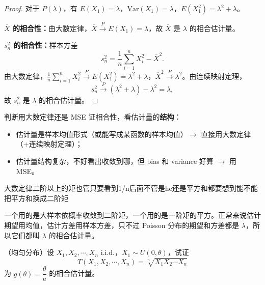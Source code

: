 \begin{proof}
对于 $P(\lambda)$，有 $E(X_1) = \lambda$，$\mathrm{Var}(X_1) = \lambda$，$E(X_1^2) = \lambda^2 + \lambda$。

\textbf{$\overline{X}$ 的相合性：}由大数定律，$\overline{X} \xrightarrow{P} E(X_1) = \lambda$，故 $\overline{X}$ 是 $\lambda$ 的相合估计量。

\textbf{$s_n^2$ 的相合性：}样本方差
\[
s_n^2 = \frac{1}{n}\sum_{i=1}^n X_i^2 - \overline{X}^2.
\]
由大数定律，$\frac{1}{n}\sum_{i=1}^n X_i^2 \xrightarrow{P} E(X_1^2) = \lambda^2 + \lambda$，$\overline{X}^2 \xrightarrow{P} \lambda^2$。由连续映射定理，
\[
s_n^2 \xrightarrow{P} (\lambda^2 + \lambda) - \lambda^2 = \lambda,
\]
故 $s_n^2$ 是 $\lambda$ 的相合估计量。
\end{proof}
\begin{dxtips}[大数定律只管均值收敛到期望不管别的]
判断用大数定律还是 MSE 证相合性，看估计量的\textbf{结构}：
\begin{itemize}
    \item 估计量是样本均值形式（或能写成某函数的样本均值）$\to$ 直接用大数定律（+连续映射定理）；
    \item 估计量结构复杂，不好看出收敛到哪，但 bias 和 variance 好算 $\to$ 用 MSE。
\end{itemize}
\end{dxtips}
\begin{note}
大数定律二阶以上的矩也管只要看到1/n后面不管是he还是平方和都要想到能不能把平方和换成二阶矩    
\end{note}
\begin{dxtips}
一个用的是大样本依概率收敛到二阶矩，一个用的是一阶矩的平方。正常来说估计期望用均值，估计方差用样本方差，只不过 Poisson 分布的期望和方差都是 $\lambda$，所以它们都叫 $\lambda$ 的相合估计量。
\end{dxtips}
\begin{homework}[5]
（均匀分布）设 $X_1, X_2, \cdots, X_n$ i.i.d.，$X_1 \sim U(0,\theta)$，试证
\[
T(X_1, X_2, \cdots, X_n) = \sqrt[n]{X_1 X_2 \cdots X_n}
\]
为 $g(\theta) = \dfrac{\theta}{\mathrm{e}}$ 的相合估计量。
\end{homework}

